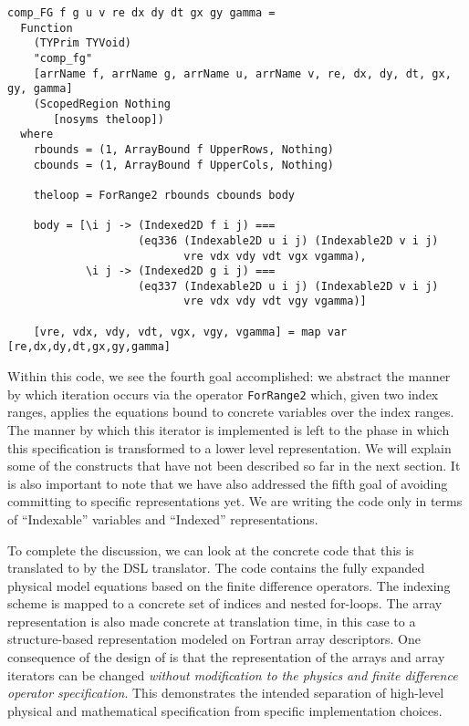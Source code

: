 \begin{lstlisting}
comp_FG f g u v re dx dy dt gx gy gamma =
  Function
    (TYPrim TYVoid)
    "comp_fg"
    [arrName f, arrName g, arrName u, arrName v, re, dx, dy, dt, gx, gy, gamma]
    (ScopedRegion Nothing
       [nosyms theloop])
  where
    rbounds = (1, ArrayBound f UpperRows, Nothing)
    cbounds = (1, ArrayBound f UpperCols, Nothing)

    theloop = ForRange2 rbounds cbounds body

    body = [\i j -> (Indexed2D f i j) ===
                    (eq336 (Indexable2D u i j) (Indexable2D v i j)
                           vre vdx vdy vdt vgx vgamma),
            \i j -> (Indexed2D g i j) ===
                    (eq337 (Indexable2D u i j) (Indexable2D v i j)
                           vre vdx vdy vdt vgy vgamma)]

    [vre, vdx, vdy, vdt, vgx, vgy, vgamma] = map var [re,dx,dy,dt,gx,gy,gamma]
\end{lstlisting}

Within this code, we see the fourth goal accomplished: we abstract the manner
by which iteration occurs via the operator {\tt ForRange2} which, given two
index ranges, applies the equations bound to concrete variables over the
index ranges.  The manner by which this iterator is implemented is left to the
phase in which this specification is transformed to a lower level representation.
We will explain some of the constructs that have not been described so far in the 
next section.  It is also important to note that we have also addressed the fifth
goal of avoiding committing to specific representations yet.  We are writing
the code only in terms of ``Indexable'' variables and ``Indexed'' representations.

To complete the discussion, we can look at the concrete code that this is translated to
by the DSL translator.  The code contains the fully expanded physical model equations based on the finite difference operators.  The indexing scheme is mapped to a concrete
set of indices and nested for-loops.  The array representation is also made concrete
at translation time, in this case to a structure-based representation modeled on
Fortran array descriptors.  One consequence of the design of \FIDDLE is that the
representation of the arrays and array iterators can be changed \emph{without
modification to the physics and finite difference operator specification}.  This
demonstrates the intended separation of high-level physical and mathematical
specification from specific implementation choices.

